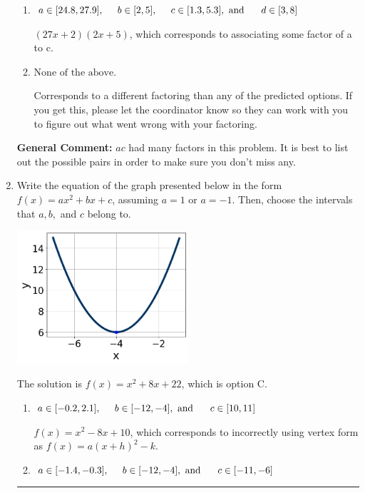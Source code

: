 \documentclass{extbook}[14pt]
\newcommand{\litem}[1]{\item #1

\rule{\textwidth}{0.4pt}}
\begin{document}
\begin{enumerate}
{\begin{enumerate}[label=\Alph*.]
* $(9x + 2)(6x + 5)$, which is the correct option.
\item \( a \in [24.8, 27.9], \hspace*{5mm} b \in [2, 5], \hspace*{5mm} c \in [1.3, 5.3], \text{ and } \hspace*{5mm} d \in [3, 8] \)

 $(27x + 2)(2x + 5)$, which corresponds to associating some factor of a to c.
\item \( \text{None of the above.} \)

 Corresponds to a different factoring than any of the predicted options. If you get this, please let the coordinator know so they can work with you to figure out what went wrong with your factoring.
\end{enumerate}

\textbf{General Comment:} $ac$ had many factors in this problem. It is best to list out the possible pairs in order to make sure you don't miss any.
}
\litem{
Write the equation of the graph presented below in the form $f(x)=ax^2+bx+c$, assuming  $a=1$ or $a=-1$. Then, choose the intervals that $a, b,$ and $c$ belong to.

\begin{center}
    \includegraphics[width=0.5\textwidth]{../Figures/quadraticGraphToEquationC.png}
\end{center}


The solution is \( f(x) = x^{2} +8 x + 22 \), which is option C.\begin{enumerate}[label=\Alph*.]
\item \( a \in [-0.2, 2.1], \hspace*{5mm} b \in [-12, -4], \text{ and } \hspace*{5mm} c \in [10, 11] \)

$f(x)=x^{2} -8 x + 10$, which corresponds to incorrectly using vertex form as $f(x) = a(x+h)^2 - k$.
\item \( a \in [-1.4, -0.3], \hspace*{5mm} b \in [-12, -4], \text{ and } \hspace*{5mm} c \in [-11, -6] \)


\end{enumerate}}
\end{enumerate}
\end{document}
